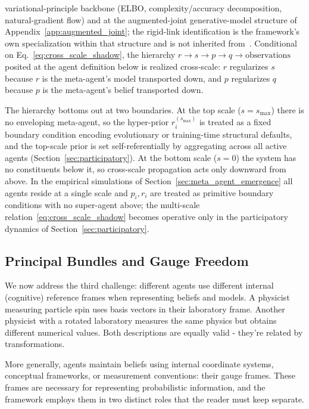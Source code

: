 \documentclass[11pt]{article}
\begin{document}
variational-principle backbone (ELBO, complexity/accuracy decomposition, natural-gradient flow) and at the augmented-joint generative-model structure of Appendix~\ref{app:augmented_joint}; the rigid-link identification is the framework's own specialization within that structure and is not inherited from~\cite{Friston2017, parr2022active}. Conditional on Eq.~\eqref{eq:cross_scale_shadow}, the hierarchy $r \to s \to p \to q \to \text{observations}$ posited at the agent definition below is realized cross-scale: $r$ regularizes $s$ because $r$ is the meta-agent's model transported down, and $p$ regularizes $q$ because $p$ is the meta-agent's belief transported down.

The hierarchy bottoms out at two boundaries. At the top scale ($s = s_{\max}$) there is no enveloping meta-agent, so the hyper-prior $r_i^{(s_{\max})}$ is treated as a fixed boundary condition encoding evolutionary or training-time structural defaults, and the top-scale prior is set self-referentially by aggregating across all active agents (Section~\ref{sec:participatory}). At the bottom scale ($s = 0$) the system has no constituents below it, so cross-scale propagation acts only downward from above. In the empirical simulations of Section~\ref{sec:meta_agent_emergence} all agents reside at a single scale and $p_i, r_i$ are treated as primitive boundary conditions with no super-agent above; the multi-scale relation~\eqref{eq:cross_scale_shadow} becomes operative only in the participatory dynamics of Section~\ref{sec:participatory}.

\subsection{Principal Bundles and Gauge Freedom}
\label{sec:agents_as_sections}

We now address the third challenge: different agents use different internal (cognitive) reference frames when representing beliefs and models. A physicist measuring particle spin uses basis vectors in their laboratory frame. Another physicist with a rotated laboratory measures the same physics but obtains different numerical values. Both descriptions are equally valid - they're related by transformations.

More generally, agents maintain beliefs using internal coordinate systems, conceptual frameworks, or measurement conventions: their gauge frames. These frames are necessary for representing probabilistic information, and the framework employs them in two distinct roles that the reader must keep separate.
\end{document}
